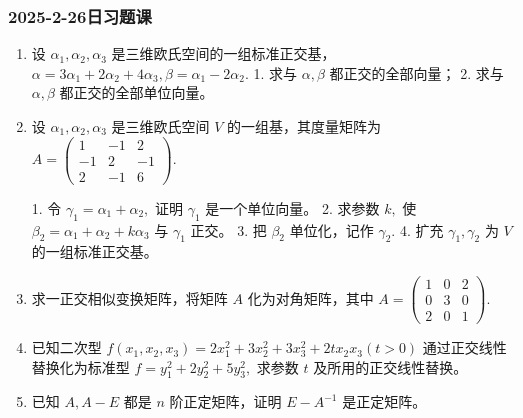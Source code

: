 \subsubsection{2025-2-26日习题课}

\begin{enumerate}
    \item 设 $\alpha_{1},\alpha_{2},\alpha_{3}$ 是三维欧氏空间的一组标准正交基，$\alpha=3\alpha_{1}+2\alpha_{2}+4\alpha_{3},\beta=\alpha_{1}-2\alpha_{2}.$
    1. 求与 $\alpha,\beta$ 都正交的全部向量；
    2. 求与 $\alpha,\beta$ 都正交的全部单位向量。
    \item 设 $\alpha_{1},\alpha_{2},\alpha_{3}$ 是三维欧氏空间 $V$ 的一组基，其度量矩阵为 $A=\begin{pmatrix}1 & -1 & 2 \\ -1 & 2 & -1 \\ 2 & -1 & 6\end{pmatrix}.$

    1. 令 $\gamma_{1}=\alpha_{1}+\alpha_{2},$ 证明 $\gamma_{1}$ 是一个单位向量。
    2. 求参数 $k,$ 使 $\beta_{2}=\alpha_{1}+\alpha_{2}+k\alpha_{3}$ 与 $\gamma_{1}$ 正交。
    3. 把 $\beta_{2}$ 单位化，记作 $\gamma_{2}.$
    4. 扩充 $\gamma_{1},\gamma_{2}$ 为 $V$ 的一组标准正交基。
    \item 求一正交相似变换矩阵，将矩阵 $A$ 化为对角矩阵，其中 $A=\begin{pmatrix}1 & 0 & 2 \\ 0 & 3 & 0 \\ 2 & 0 & 1\end{pmatrix}.$
    \item 已知二次型 $f(x_{1},x_{2},x_{3})=2x_{1}^{2}+3x_{2}^{2}+3x_{3}^{2}+2tx_{2}x_{3}(t > 0)$ 通过正交线性替换化为标准型 $f=y_{1}^{2}+2y_{2}^{2}+5y_{3}^{2},$ 求参数 $t$ 及所用的正交线性替换。
    \item 已知 $A,A-E$ 都是 $n$ 阶正定矩阵，证明 $E-A^{-1}$ 是正定矩阵。
\end{enumerate}
